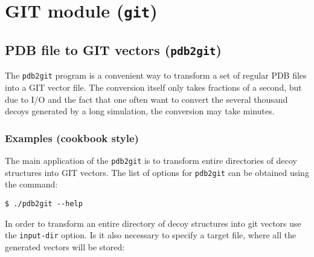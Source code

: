 \chapter{GIT module (\texttt{git})}
\label{cha:git-module}


\section{PDB file to GIT vectors (\texttt{pdb2git})}
\label{sec:pdb2git-executable}

The \texttt{pdb2git} program is a convenient way to transform a set of
regular PDB files into a GIT vector file. The conversion itself only
takes fractions of a second, but due to I/O and the fact that one
often want to convert the several thousand decoys generated by a long
simulation, the conversion may take minutes.

\begin{optiontable}




\end{optiontable}
  
\subsection{Examples (cookbook style)}
\label{sec:examples-pdb2git}

The main application of the \texttt{pdb2git} is to transform entire
directories of decoy structures into GIT vectors. The list of options
for \texttt{pdb2git} can be obtained using the command:

\begin{verbatim}
$ ./pdb2git --help
\end{verbatim}

\noindent In order to transform an entire directory of decoy
structures into git vectors use the \texttt{input-dir} option. Is it
also necessary to specify a target file, where all the generated
vectors will be stored:

